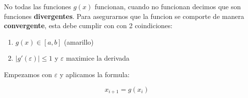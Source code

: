 \documentclass[10pt]{article}
\begin{document}
No todas las funciones $g(x)$ funcionan, cuando no funcionan decimos
que son funciones \textbf{divergentes}. Para asegurarnos que la funcion
se comporte de manera \textbf{convergente}, esta debe cumplir con con 2 coindiciones:

\begin{enumerate}
	\item $g(x) \in [a, b]$ (amarillo)
	\item $|g'(\varepsilon)| \leq 1$ y $\varepsilon$ maximice la derivada
\end{enumerate}

Empezamos con $\varepsilon$ y aplicamos la formula:

\begin{equation}
	x_{i+1} = g(x_i)
\end{equation}
\end{document}
